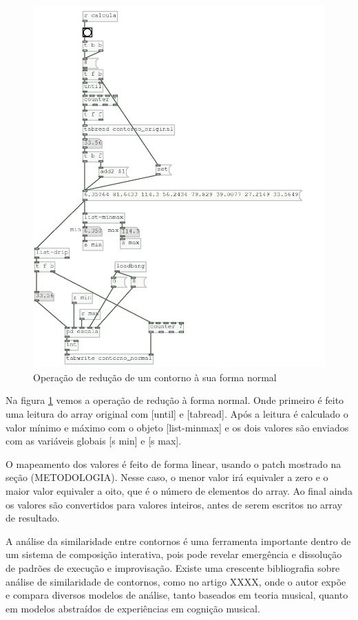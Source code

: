 \documentclass{ppgmus}
\begin{document}
\begin{figure}
\includegraphics[scale=.6]{func-contorno-normal}
\caption{Operação de redução de um contorno à sua forma normal}
\label{func-contorno-normal}
\end{figure}

Na figura \ref{func-contorno-normal} vemos a operação de redução à forma normal.
Onde primeiro é feito uma leitura do array original com [until] e [tabread]. Após
a leitura é calculado o valor mínimo e máximo com o objeto [list-minmax] e os dois
valores são enviados com as variáveis globais [s min] e [s max].

O mapeamento dos valores é feito de forma linear, usando o patch mostrado na seção (METODOLOGIA).
Nesse caso, o menor valor irá equivaler a zero e o maior valor equivaler a oito, que é o
número de elementos do array. Ao final ainda os valores são convertidos para valores inteiros,
antes de serem escritos no array de resultado.

A análise da similaridade entre contornos é uma ferramenta importante dentro
 de um sistema de composição interativa, pois pode revelar emergência e dissolução de 
padrões de execução e improvisação. 
Existe uma crescente bibliografia sobre análise de similaridade de contornos,
como no artigo XXXX, onde o autor expõe e compara diversos modelos de análise,
tanto baseados em teoria musical, quanto em modelos abstraídos de experiências
em cognição musical.
\end{document}
